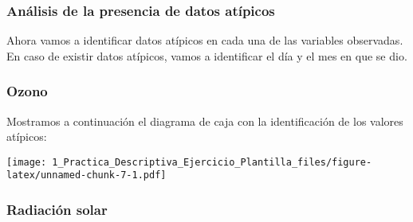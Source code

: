 \documentclass[
]{article}
\newenvironment{Shaded}{\begin{snugshade}}{\end{snugshade}}
\newcommand{\CommentTok}[1]{\textcolor[rgb]{0.56,0.35,0.01}{\textit{#1}}}
\newcommand{\DecValTok}[1]{\textcolor[rgb]{0.00,0.00,0.81}{#1}}
\newcommand{\FloatTok}[1]{\textcolor[rgb]{0.00,0.00,0.81}{#1}}
\newcommand{\KeywordTok}[1]{\textcolor[rgb]{0.13,0.29,0.53}{\textbf{#1}}}
\newcommand{\NormalTok}[1]{#1}
\newcommand{\OperatorTok}[1]{\textcolor[rgb]{0.81,0.36,0.00}{\textbf{#1}}}
\newcommand{\StringTok}[1]{\textcolor[rgb]{0.31,0.60,0.02}{#1}}
\begin{document}
\hypertarget{anuxe1lisis-de-la-presencia-de-datos-atuxedpicos}{%
\subsubsection{Análisis de la presencia de datos
atípicos}\label{anuxe1lisis-de-la-presencia-de-datos-atuxedpicos}}

Ahora vamos a identificar datos atípicos en cada una de las variables
observadas. En caso de existir datos atípicos, vamos a identificar el
día y el mes en que se dio.

\hypertarget{ozono-1}{%
\subsubsection{Ozono}\label{ozono-1}}

Mostramos a continuación el diagrama de caja con la identificación de
los valores atípicos:

\begin{Shaded}
\end{Shaded}

\texttt{[image: 1\_Practica\_Descriptiva\_Ejercicio\_Plantilla\_files/figure-latex/unnamed-chunk-7-1.pdf]}

\hypertarget{radiaciuxf3n-solar-1}{%
\subsubsection{Radiación solar}\label{radiaciuxf3n-solar-1}}
\end{document}

